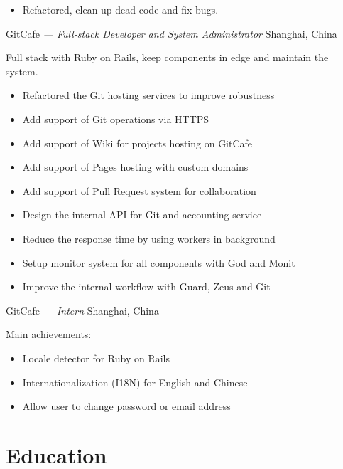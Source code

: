 \documentclass[]{friggeri-cv} %
\begin{document}
\begin{entrylist}
{\begin{itemize}
      \item Refactored, clean up dead code and fix bugs.
    \end{itemize}
  }
  {GitCafe \emph{--- Full-stack Developer and System Administrator}}
  {Shanghai, China}
  {
    Full stack with Ruby on Rails, keep components in edge and maintain the system.\@
    \begin{itemize}
    \item Refactored the Git hosting services to improve robustness
    \item Add support of Git operations via HTTPS
    \item Add support of Wiki for projects hosting on GitCafe
    \item Add support of Pages hosting with custom domains
    \item Add support of Pull Request system for collaboration
    \item Design the internal API for Git and accounting service
    \item Reduce the response time by using workers in background
    \item Setup monitor system for all components with God and Monit
    \item Improve the internal workflow with Guard, Zeus and Git
    \end{itemize}
  }
  {GitCafe \emph{--- Intern}}
  {Shanghai, China}
  {
    Main achievements:
    \begin{itemize}
    \item Locale detector for Ruby on Rails
    \item Internationalization (I18N) for English and Chinese
    \item Allow user to change password or email address
    \end{itemize}
  }
\end{entrylist}


\section{Education}
\end{document}
